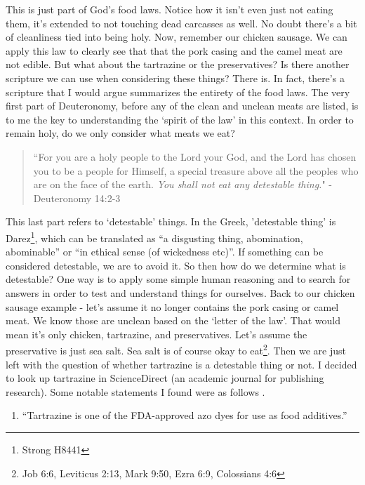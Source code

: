 \documentclass[10pt]{article}
\begin{document}
\begin{multicols}{2}
This is just part of God's food laws. Notice how it isn't even just not eating them, it's extended to not touching dead carcasses as well. No doubt there's a bit of cleanliness tied into being holy. Now, remember our chicken sausage. We can apply this law to clearly see that that the pork casing and the camel meat are not edible. But what about the tartrazine or the preservatives? Is there another scripture we can use when considering these things? There is. In fact, there's a scripture that I would argue summarizes the entirety of the food laws. The very first part of Deuteronomy, before any of the clean and unclean meats are listed, is to me the key to understanding the `spirit of the law' in this context. In order to remain holy, do we only consider what meats we eat?

\begin{quotation}
	``For you are a holy people to the Lord your God, and the Lord has chosen you to be a people for Himself, a special treasure above all the peoples who are on the face of the earth. \textit{You shall not eat any detestable thing.}" - Deuteronomy 14:2-3
\end{quotation}

This last part refers to `detestable' things. In the Greek, 'detestable thing' is Darez\footnote{Strong H8441}, which can be translated as ``a disgusting thing, abomination, abominable'' or ``in ethical sense (of wickedness etc)''\cite{Strongs}. If something can be considered detestable, we are to avoid it. So then how do we determine what is detestable? One way is to apply some simple human reasoning and to search for answers in order to test and understand things for ourselves. Back to our chicken sausage example - let's assume it no longer contains the pork casing or camel meat. We know those are unclean based on the `letter of the law'. That would mean it's only chicken, tartrazine, and preservatives. Let's assume the preservative is just sea salt. Sea salt is of course okay to eat\footnote{Job 6:6, Leviticus 2:13, Mark 9:50, Ezra 6:9, Colossians 4:6}. Then we are just left with the question of whether tartrazine is a detestable thing or not. I decided to look up tartrazine in ScienceDirect (an academic journal for publishing research). Some notable statements I found were as follows \cite{tartrazine}.

\begin{enumerate}
	\item ``Tartrazine is one of the FDA-approved azo dyes for use as food additives.''
	

\end{enumerate}
\end{multicols}
\end{document}
